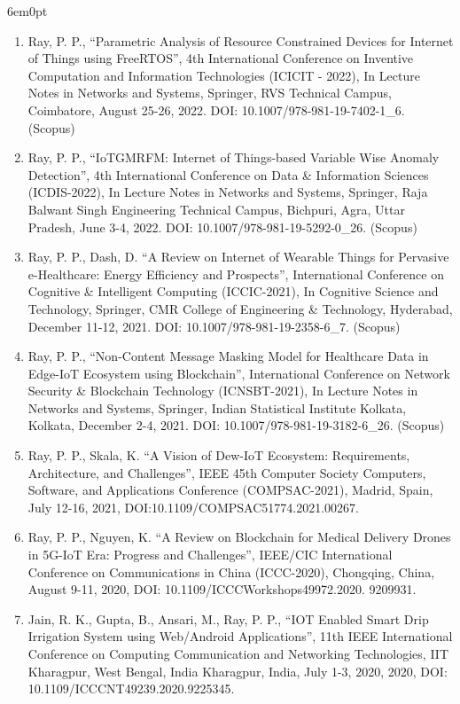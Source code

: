 \documentclass[11pt,a4paper]{moderncv}
\begin{document}
\begin{adjustwidth}{6em}{0pt}
\begin{enumerate}
	\item Ray, P. P., “Parametric Analysis of Resource Constrained Devices for Internet of Things using FreeRTOS”, 4th International Conference on Inventive Computation and Information Technologies (ICICIT - 2022), In Lecture Notes in Networks and Systems, Springer, RVS Technical Campus, Coimbatore, August 25-26, 2022. DOI: 10.1007/978-981-19-7402-1\_6. (Scopus)
	
	\item Ray, P. P., “IoTGMRFM: Internet of Things-based Variable Wise Anomaly Detection”, 4th International Conference on Data \& Information Sciences (ICDIS-2022), In Lecture Notes in Networks and Systems, Springer, Raja Balwant Singh Engineering Technical Campus, Bichpuri, Agra, Uttar Pradesh, June 3-4, 2022. DOI: 10.1007/978-981-19-5292-0\_26. (Scopus)
	
	\item Ray, P. P., Dash, D. “A Review on Internet of Wearable Things for Pervasive e-Healthcare: Energy Efficiency and Prospects”, International Conference on Cognitive \& Intelligent Computing (ICCIC-2021), In Cognitive Science and Technology, Springer, CMR College of Engineering \& Technology, Hyderabad, December 11-12, 2021. DOI: 10.1007/978-981-19-2358-6\_7. (Scopus)
	
	\item Ray, P. P., “Non-Content Message Masking Model for Healthcare Data in Edge-IoT Ecosystem using Blockchain”, International Conference on Network Security \& Blockchain Technology (ICNSBT-2021), In Lecture Notes in Networks and Systems, Springer, Indian Statistical Institute Kolkata, Kolkata, December 2-4, 2021. DOI: 10.1007/978-981-19-3182-6\_26. (Scopus)  
	
	\item Ray, P. P., Skala, K. “A Vision of Dew-IoT Ecosystem: Requirements, Architecture, and Challenges”, IEEE 45th Computer Society Computers, Software, and Applications Conference (COMPSAC-2021), Madrid, Spain, July 12-16, 2021, DOI:10.1109/COMPSAC51774.2021.00267.
	
	\item Ray, P. P., Nguyen, K. “A Review on Blockchain for Medical Delivery Drones in 5G-IoT Era: Progress and Challenges”, IEEE/CIC International Conference on Communications in China (ICCC-2020), Chongqing, China, August 9-11, 2020, DOI: 10.1109/ICCCWorkshops49972.2020. 9209931.
	
	\item Jain, R. K., Gupta, B., Ansari, M., Ray, P. P., “IOT Enabled Smart Drip Irrigation System using Web/Android Applications”, 11th IEEE International Conference on Computing Communication and Networking Technologies, IIT Kharagpur, West Bengal, India Kharagpur, India, July 1-3, 2020, 2020, DOI: 10.1109/ICCCNT49239.2020.9225345.
	

\end{enumerate}
\end{adjustwidth}
\end{document}
